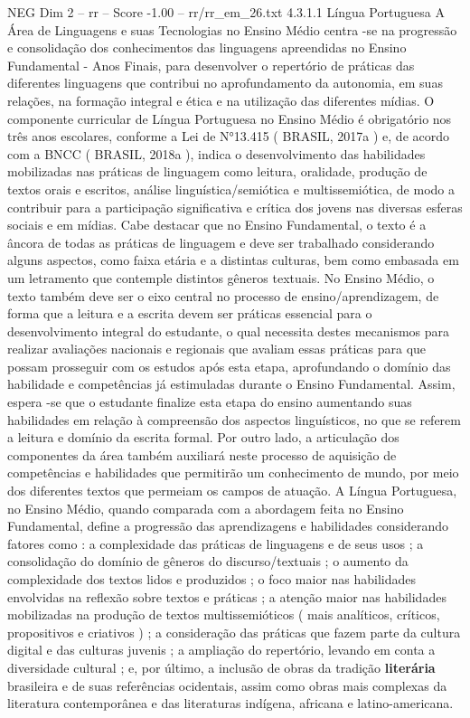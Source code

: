 \begin{textsample}{NEG Dim 2 – rr – Score -1.00 – rr/rr\_em\_26.txt}  \label{ex:f2_neg_184}
4.3.1.1 Língua Portuguesa A Área de Linguagens e suas Tecnologias no Ensino Médio centra -se na progressão e consolidação dos conhecimentos das linguagens apreendidas no Ensino Fundamental - Anos Finais, para desenvolver o repertório de práticas das diferentes linguagens que contribui no aprofundamento da autonomia, em suas relações, na formação integral e ética e na utilização das diferentes mídias.
O componente curricular de Língua Portuguesa no Ensino Médio é obrigatório nos três anos escolares, conforme a Lei de N{\EmojiFont °}13.415 ( BRASIL, 2017a ) e, de acordo com a BNCC ( BRASIL, 2018a ), indica o desenvolvimento das habilidades mobilizadas nas práticas de linguagem como leitura, oralidade, produção de textos orais e escritos, análise linguística/semiótica e multissemiótica, de modo a contribuir para a participação significativa e crítica dos jovens nas diversas esferas sociais e em mídias.
Cabe destacar que no Ensino Fundamental, o texto é a âncora de todas as práticas de linguagem e deve ser trabalhado considerando alguns aspectos, como faixa etária e a distintas culturas, bem como embasada em um letramento que contemple distintos gêneros textuais.
No Ensino Médio, o texto também deve ser o eixo central no processo de ensino/aprendizagem, de forma que a leitura e a escrita devem ser práticas essencial para o desenvolvimento integral do estudante, o qual necessita destes mecanismos para realizar avaliações nacionais e regionais que avaliam essas práticas para que possam prosseguir com os estudos após esta etapa, aprofundando o domínio das habilidade e competências já estimuladas durante o Ensino Fundamental.
Assim, espera -se que o estudante finalize esta etapa do ensino aumentando suas habilidades em relação à compreensão dos aspectos linguísticos, no que se referem a leitura e domínio da escrita formal.
Por outro lado, a articulação dos componentes da área também auxiliará neste processo de aquisição de competências e habilidades que permitirão um conhecimento de mundo, por meio dos diferentes textos que permeiam os campos de atuação.
A Língua Portuguesa, no Ensino Médio, quando comparada com a abordagem feita no Ensino Fundamental, define a progressão das aprendizagens e habilidades considerando fatores como : a complexidade das práticas de linguagens e de seus usos ; a consolidação do domínio de gêneros do discurso/textuais ; o aumento da complexidade dos textos lidos e produzidos ; o foco maior nas habilidades envolvidas na reflexão sobre textos e práticas ; a atenção maior nas habilidades mobilizadas na produção de textos multissemióticos ( mais analíticos, críticos, propositivos e criativos ) ; a consideração das práticas que fazem parte da cultura digital e das culturas juvenis ; a ampliação do repertório, levando em conta a diversidade cultural ; e, por último, a inclusão de obras da tradição \textbf{literária} brasileira e de suas referências ocidentais, assim como obras mais complexas da literatura contemporânea e das literaturas indígena, africana e latino-americana.

\end{textsample}
